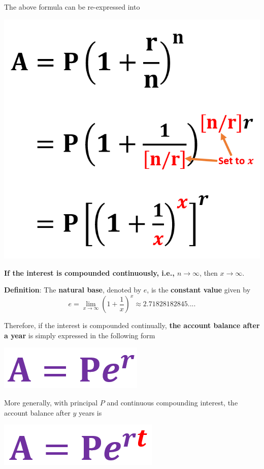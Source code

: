 \documentclass[
]{book}
\begin{document}
The above formula can be re-expressed into

\begin{center}\includegraphics[width=0.6\linewidth]{img04/w04-CompoundingInterest02} \end{center}

\textbf{\color{red}If the interest is compounded continuously, i.e., \(n \to \infty\)}, then \textbf{\color{blue}\(x \to \infty\)}.

\hfill\break

\textbf{Definition}: The \textbf{natural base}, denoted by \(e\), is the \textbf{constant value} given by
\[
e = \lim_{x \to \infty}\left( 1 + \frac{1}{x}\right)^x \approx 2.71828182845....
\]

Therefore, if the interest is compounded continually, \textbf{\color{red}the account balance after a year} is simply expressed in the following form

\begin{center}\includegraphics[width=0.3\linewidth]{img04/w04-AnnualBalanceContinuousCompounding} \end{center}

More generally, with principal \(P\) and continuous compounding interest, the account balance after \(y\) years is

\begin{center}\includegraphics[width=0.3\linewidth]{img04/w04-AnnualBalanceT-years-balance} \end{center}
\end{document}

